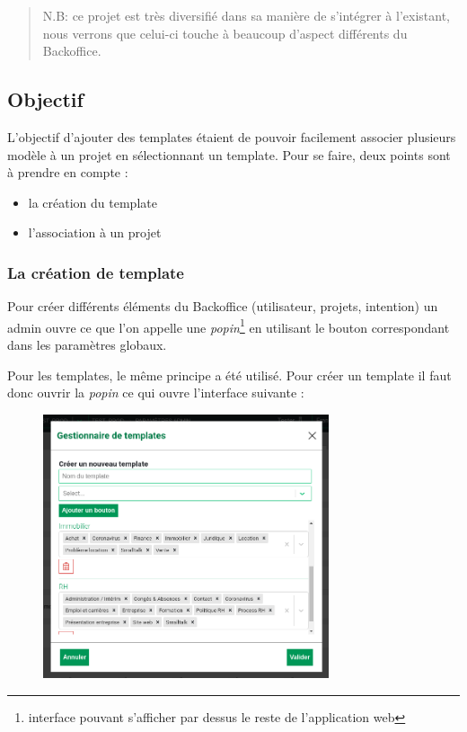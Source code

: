 \documentclass[12pt,a4paper,oneside]{scrreprt}
\begin{document}
\begin{quote}
N.B: ce projet est très diversifié dans sa manière de s'intégrer à l'existant, nous verrons que celui-ci touche à beaucoup d'aspect différents du Backoffice.
\end{quote}

\newpage
\subsection{Objectif}

L'objectif d'ajouter des templates étaient de pouvoir facilement associer plusieurs modèle à un projet en sélectionnant un template. Pour se faire, deux points sont à prendre en compte :
\begin{itemize}
	\item la création du template
	\item l'association à un projet
\end{itemize}

\subsubsection{La création de template}

Pour créer différents éléments du Backoffice (utilisateur, projets, intention) un admin ouvre ce que l'on appelle une \textit{popin}\footnote{interface pouvant s'afficher par dessus le reste de l'application web} en utilisant le bouton correspondant dans les paramètres globaux.

Pour les templates, le même principe a été utilisé. Pour créer un template il faut donc ouvrir la \textit{popin} ce qui ouvre l'interface suivante :

\begin{figure}[!ht]
\centering
	\includegraphics[width=0.75\textwidth]{pictures/popin_create_templates.png}
\end{figure}
\end{document}
